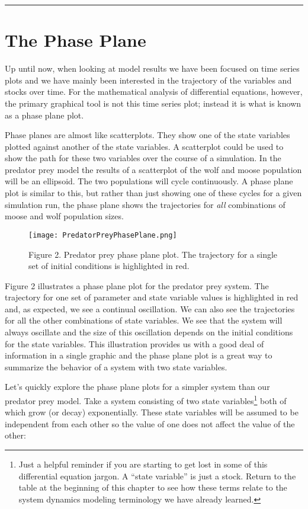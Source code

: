 \documentclass[]{memoir}
\makeatletter
\def\maxwidth{\ifdim\Gin@nat@width>\linewidth\linewidth
\else\Gin@nat@width\fi}
\let\Oldincludegraphics\includegraphics
\renewcommand{\includegraphics}[1]{\Oldincludegraphics[width=\maxwidth]{#1}}
\makeatother
\begin{document}
\begin{center}\rule{3in}{0.4pt}\end{center}

\section{The Phase Plane}

Up until now, when looking at model results we have been focused on time
series plots and we have mainly been interested in the trajectory of the
variables and stocks over time. For the mathematical analysis of
differential equations, however, the primary graphical tool is not this
time series plot; instead it is what is known as a phase plane plot.

Phase planes are almost like scatterplots. They show one of the state
variables plotted against another of the state variables. A scatterplot
could be used to show the path for these two variables over the course
of a simulation. In the predator prey model the results of a scatterplot
of the wolf and moose population will be an ellipsoid. The two
populations will cycle continuously. A phase plane plot is similar to
this, but rather than just showing one of these cycles for a given
simulation run, the phase plane shows the trajectories for \emph{all}
combinations of moose and wolf population sizes.

\begin{figure}[htbp]
\centering
\texttt{[image: PredatorPreyPhasePlane.png]}
\caption{Figure 2. Predator prey phase plane plot. The trajectory for a
single set of initial conditions is highlighted in red.}
\end{figure}

Figure 2 illustrates a phase plane plot for the predator prey system.
The trajectory for one set of parameter and state variable values is
highlighted in red and, as expected, we see a continual oscillation. We
can also see the trajectories for all the other combinations of state
variables. We see that the system will always oscillate and the size of
this oscillation depends on the initial conditions for the state
variables. This illustration provides us with a good deal of information
in a single graphic and the phase plane plot is a great way to summarize
the behavior of a system with two state variables.

Let's quickly explore the phase plane plots for a simpler system than
our predator prey model. Take a system consisting of two state
variables\footnote{Just a helpful reminder if you are starting to get
  lost in some of this differential equation jargon. A ``state
  variable'' is just a stock. Return to the table at the beginning of
  this chapter to see how these terms relate to the system dynamics
  modeling terminology we have already learned.} both of which grow (or
decay) exponentially. These state variables will be assumed to be
independent from each other so the value of one does not affect the
value of the other:
\end{document}

